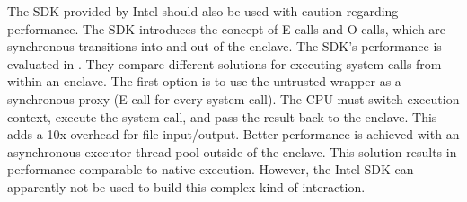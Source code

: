 The SDK provided by Intel should also be used with caution regarding performance. The SDK introduces the concept of E-calls and O-calls, which are synchronous transitions into and out of the enclave.\cite[]{b}\label{ID_1781049317}
The SDK's performance is evaluated in \cite{Arnautov2016}.\label{ID_905850038}
They compare different solutions for executing system calls from within an enclave.\label{ID_1493078645}
The first option is to use the untrusted wrapper as a synchronous proxy (E-call for every system call). The CPU must switch execution context, execute the system call, and pass the result back to the enclave. This adds a 10x overhead for file input/output.\label{ID_642315590}
Better performance is achieved with an asynchronous executor thread pool outside of the enclave. This solution results in performance comparable to native execution.\cite[]{Arnautov2016}\label{ID_1629826277}
However, the Intel SDK can apparently not be used to build this complex kind of interaction.\label{ID_501911684}

